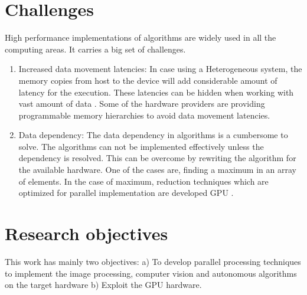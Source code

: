 \section{Challenges}
High performance implementations of algorithms are widely used in all the computing areas. It carries a big set of challenges.
\begin{enumerate}
\item  Increased data movement latencies: In case using a Heterogeneous system, the memory copies from host to the device will add considerable amount of latency for the execution. These latencies can be hidden when working with vast amount of data \cite{hpc}. Some of the hardware providers are providing programmable memory hierarchies to avoid data movement latencies. 
\item  Data dependency: The data dependency in algorithms is a cumbersome to solve. The algorithms can not be implemented effectively unless the dependency is resolved. This can be overcome by rewriting the algorithm for the available hardware. One of the cases are, finding a maximum in an array of elements. In the case of maximum, reduction techniques which are optimized for parallel implementation are developed GPU \cite{max}.
\end{enumerate}

\section{Research objectives}
This work has mainly two objectives: a) To develop parallel processing techniques to implement the image processing, computer vision and autonomous algorithms on the target hardware b) Exploit the GPU hardware.
